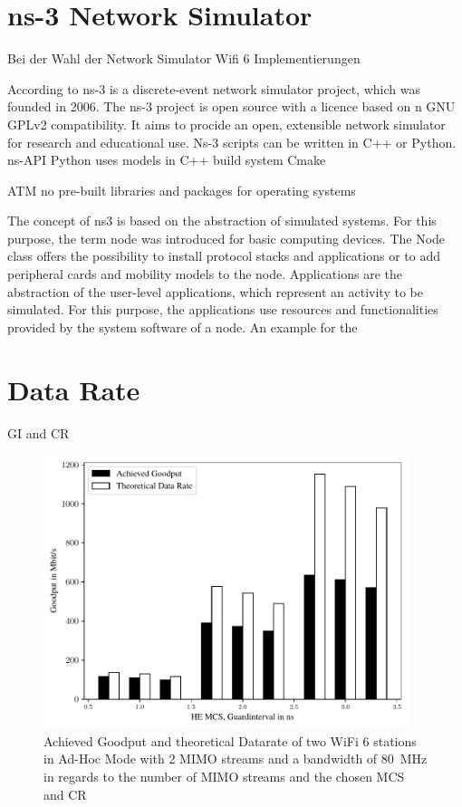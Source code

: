\documentclass[]{nsm-thesis}
\begin{document}
 
 
\section{ns-3 Network Simulator}

Bei der Wahl der Network Simulator Wifi 6 Implementierungen 



According to \cite{ns3manual} ns-3 is a discrete-event network simulator project, which was founded in 2006. The ns-3 project is open source with a licence based on n GNU GPLv2 compatibility. It aims to procide an open, extensible network simulator for research and educational use. Ns-3 scripts can be written in C++ or Python.
ns-API Python uses models in C++
build system Cmake

ATM no pre-built libraries and packages for operating systems
 
The concept of ns3 is based on the abstraction of simulated systems. For this purpose, the term node was introduced for basic computing devices. The Node class offers the possibility to install protocol stacks and applications or to add peripheral cards and mobility models to the node.
Applications are the abstraction of the user-level applications, which represent an activity to be simulated. For this purpose, the applications use resources and functionalities provided by the system software of a node. An example for the 



\section{Data Rate}


\ac{GI} and \ac{CR}
\begin{figure}%
	\centering
	\includegraphics[width=0.95\textwidth]{figures/gi_dataRate_simulation.pdf}
	\caption{Achieved Goodput and theoretical Datarate of two WiFi 6 stations in Ad-Hoc Mode with \num{2} \ac{MIMO} streams and a bandwidth of \SI{80}{\mega\hertz} in regards to the number of \ac{MIMO} streams and the chosen \ac{MCS} and \ac{CR}}%
	\label{fig:Data_rate_GI}%
\end{figure}
\end{document}
